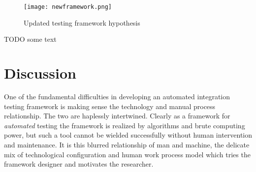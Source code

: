 \documentclass[12pt,a4paper,oneside,pdftex]{report}
\begin{document}
{\begin{figure}[H]
\centering
\texttt{[image: newframework.png]}
\caption{Updated testing framework hypothesis}
\label{fig:newframework}
\end{figure}

TODO some text





\chapter{Discussion}
\label{chapter:discussion}

\begin{comment}
- the mixing of manual and technical aspects
- examples of technical, contextual needs, flexible software
- manual, involving stakeholders and getting support, maintaining the model
- the result is generalizable in parts at least (manual process part that is)

- integration testing neglected subject
- staging post or more
- component testing
- doing away with integration, testing as software grows
- responsibilities per integration, difficult to maintain otherwise, whose responsibiltiy?
- getting to the beef - a compromise

- capture replay remains debateable
\end{comment}

One of the fundamental difficulties in developing an automated integration testing framework is making sense the technology and manual process relationship. The two are haplessly intertwined. Clearly as a framework for \emph{automated} testing the framework is realized by algorithms and brute computing power, but such a tool cannot be wielded successfully without human intervention and maintenance. It is this blurred relationship of man and machine, the delicate mix of technological configuration and human work process model which tries the framework designer and motivates the researcher. 

}
\end{document}
